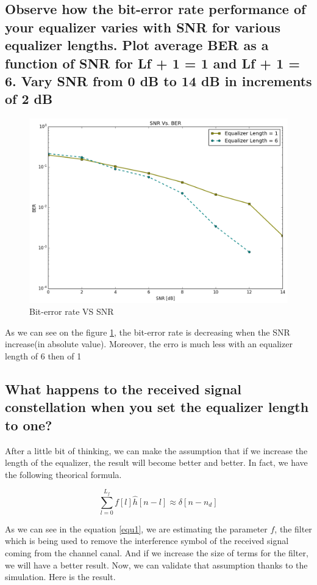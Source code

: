 \documentclass[frenchb, oneside, headings=normal]{scrartcl}
\begin{document}
\subsection{Observe how the bit-error rate performance
of your equalizer varies with SNR for various equalizer lengths. Plot average BER as a function of SNR for Lf + 1 = 1 and Lf + 1 = 6.
Vary SNR from 0 dB to 14 dB in increments of 2 dB}

\begin{figure}[ht!]
\centering
\includegraphics[scale=0.25]{img/SNR.png}
\caption{Bit-error rate VS SNR}
\label{BER}
\end{figure}


As we can see on the figure \ref{BER}, the bit-error rate is decreasing when the SNR increase(in absolute value).
Moreover, the erro is much less with an equalizer length of 6 then  of 1


\subsection{What happens to the received signal constellation when you set the equalizer length to one?}

After a little bit of thinking, we can make the assumption that if we increase the length of the equalizer, the result will become better and better. In fact, we have the following theorical formula. 

\begin{equation}
\sum_{l=0}^{L_f}f[l]\hat{h}[n-l]\approx \delta [n-n_d]
\label{equ1}
\end{equation}

As we can see in the equation \ref{equ1}, we are estimating the parameter $f$, the filter which is being used to remove the interference symbol of the received signal coming from the channel canal. And if we increase the size of terms for the filter, we will have a better result. Now, we can validate that assumption thanks to the simulation. Here is the result.
\end{document}
